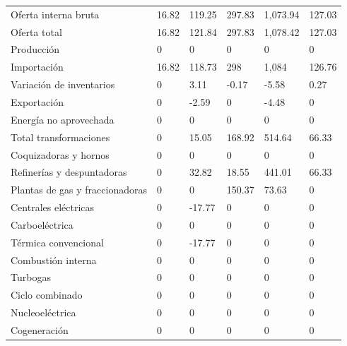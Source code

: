 \documentclass{sener2025}
\begin{document}
\begin{tabladoradoLargo}
\begin{xltabular}{\textwidth}{YZZZZZ}
    Oferta interna bruta & 16.82 & 119.25 & 297.83 & 1,073.94 & 127.03 \\
    \hspace{1.35em} Oferta total & 16.82 & 121.84 & 297.83 & 1,078.42 & 127.03 \\
    \hspace{2.7em} Producción & 0 & 0 & 0 & 0 & 0 \\
    \hspace{2.7em} Importación & 16.82 & 118.73 & 298 & 1,084 & 126.76 \\
    \hspace{2.7em} Variación de inventarios & 0 & 3.11 & -0.17 & -5.58 & 0.27 \\
    \hspace{1.35em} Exportación & 0 & -2.59 & 0 & -4.48 & 0 \\
    \hspace{1.35em} Energía no aprovechada & 0 & 0 & 0 & 0 & 0 \\
    Total transformaciones & 0 & 15.05 & 168.92 & 514.64 & 66.33 \\
    \hspace{1.35em} Coquizadoras y hornos & 0 & 0 & 0 & 0 & 0 \\
    \hspace{1.35em} Refinerías y despuntadoras & 0 & 32.82 & 18.55 & 441.01 & 66.33 \\
    \hspace{1.35em} Plantas de gas y fraccionadoras & 0 & 0 & 150.37 & 73.63 & 0 \\
    \hspace{1.35em} Centrales eléctricas & 0 & -17.77 & 0 & 0 & 0 \\
    \hspace{2.7em} Carboeléctrica & 0 & 0 & 0 & 0 & 0 \\
    \hspace{2.7em} Térmica convencional & 0 & -17.77 & 0 & 0 & 0 \\
    \hspace{2.7em} Combustión interna & 0 & 0 & 0 & 0 & 0 \\
    \hspace{2.7em} Turbogas & 0 & 0 & 0 & 0 & 0 \\
    \hspace{2.7em} Ciclo combinado & 0 & 0 & 0 & 0 & 0 \\
    \hspace{2.7em} Nucleoeléctrica & 0 & 0 & 0 & 0 & 0 \\
    \hspace{2.7em} Cogeneración & 0 & 0 & 0 & 0 & 0 \\

\end{xltabular}
\end{tabladoradoLargo}
\end{document}
